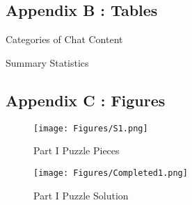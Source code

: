 \subsection{Appendix B : Tables} \label{sec:App}



%         

%  

\begin{table}[H]
 \captionsetup{justification=raggedright,singlelinecheck=false}
\caption{Categories of Chat Content } \label{tab:table4}
        
\end{table}

\begin{table}[H]
 \captionsetup{justification=raggedright,singlelinecheck=false}
\caption{Summary Statistics  } \label{tab:table4}
    \begin{center}
        
    \end{center}
\end{table}

 

%         




\subsection{Appendix C : Figures}

\begin{figure}[H]
 \captionsetup{justification=raggedright,singlelinecheck=false}
\caption{Part I Puzzle Pieces}
\texttt{[image: Figures/S1.png]} 
\end{figure}

 

\begin{figure}[H]
 \captionsetup{justification=raggedright,singlelinecheck=false}
\caption{Part I Puzzle Solution}
\texttt{[image: Figures/Completed1.png]} 
\end{figure}

